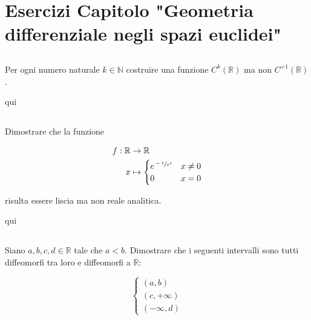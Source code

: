 \chapter{Esercizi Capitolo "Geometria differenziale negli spazi euclidei"}

\tocless\section{}\label{es1-1}

\begin{tcolorbox}
	Per ogni numero naturale $ k \in \mathbb{N} $ costruire una funzione $ C^{k}(\mathbb{R}) $ ma non $ C^{+1}(\mathbb{R}) $.
\end{tcolorbox}

qui

\tocless\section{}\label{es1-2}

\begin{tcolorbox}
	Dimostrare che la funzione
	
	\begin{align}
		\begin{split}
			f : \mathbb{R} & \to \mathbb{R}\\
			x &\mapsto%
				\begin{cases}
					e^{\sfrac{-1}{x^{2}}} & x \neq 0\\
					0 & x = 0
				\end{cases}
		\end{split}
	\end{align}
	
	risulta essere liscia ma non reale analitica.
\end{tcolorbox}

qui

\tocless\section{}\label{es1-3}

\begin{tcolorbox}
	Siano $ a,b,c,d \in \mathbb{R} $ tale che $ a<b $. Dimostrare che i seguenti intervalli sono tutti diffeomorfi tra loro e diffeomorfi a $ \mathbb{R} $:
	
	\begin{equation}
		\begin{cases}
			(a,b)\\
			(c,+\infty)\\
			(-\infty,d)
		\end{cases}
	\end{equation}
\end{tcolorbox}

